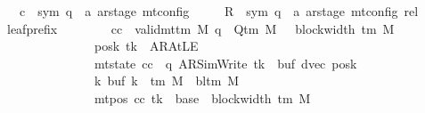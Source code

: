 \begin{isabellebody}
\ \ \ \ \ c{\isacharprime}{\kern0pt}\ {\isacharcolon}{\kern0pt}{\isacharcolon}{\kern0pt}\ {\isachardoublequoteopen}{\isacharparenleft}{\kern0pt}sym{}{\isacharcomma}{\kern0pt}\ {\isacharprime}{\kern0pt}q\ {\isasymtimes}\ {\isacharprime}{\kern0pt}a\ ar{\isacharunderscore}{\kern0pt}stage{\isacharparenright}{\kern0pt}\ mt{\isacharunderscore}{\kern0pt}config{\isachardoublequoteclose}\isanewline
\ \ \ \ \ R{\isacharprime}{\kern0pt}\ {\isacharcolon}{\kern0pt}{\isacharcolon}{\kern0pt}\ {\isachardoublequoteopen}{\isacharparenleft}{\kern0pt}sym{}{\isacharcomma}{\kern0pt}\ {\isacharprime}{\kern0pt}q\ {\isasymtimes}\ {\isacharprime}{\kern0pt}a\ ar{\isacharunderscore}{\kern0pt}stage{\isacharparenright}{\kern0pt}\ mt{\isacharunderscore}{\kern0pt}config\ rel{\isachardoublequoteclose}\isanewline
\ \ \ leaf{\isacharunderscore}{\kern0pt}prefix{\isacharcolon}{\kern0pt}\isanewline
\ \ \ \ \ \ \ \ {\isachardoublequoteopen}{\isasymAnd}cc{\isachardot}{\kern0pt}\ {\isasymlbrakk}\ valid{\isacharunderscore}{\kern0pt}mttm\ M{\isacharsemicolon}{\kern0pt}\ q\ {\isasymin}\ Q{\isacharunderscore}{\kern0pt}tm\ M{\isacharsemicolon}{\kern0pt}\ {}\ {\isasymle}\ block{\isacharunderscore}{\kern0pt}width\ {\isacharparenleft}{\kern0pt}{\isasymGamma}{\isacharunderscore}{\kern0pt}tm\ M{\isacharparenright}{\kern0pt}{\isacharsemicolon}{\kern0pt}\isanewline
\ \ \ \ \ \ \ \ \ \ \ \ \ \ \ \ \ posk\ tk\ {\isasymnoteq}\ AR{\isacharunderscore}{\kern0pt}AtLE{\isacharsemicolon}{\kern0pt}\isanewline
\ \ \ \ \ \ \ \ \ \ \ \ \ \ \ \ \ mt{\isacharunderscore}{\kern0pt}state\ cc\ {\isacharequal}{\kern0pt}\ {\isacharparenleft}{\kern0pt}q{\isacharcomma}{\kern0pt}\ AR{\isacharunderscore}{\kern0pt}SimWrite{\isacharcomma}{\kern0pt}\ tk{\isacharcomma}{\kern0pt}\ {}{\isacharcomma}{\kern0pt}\ buf{\isacharcomma}{\kern0pt}\ dvec{\isacharcomma}{\kern0pt}\ posk{\isacharparenright}{\kern0pt}{\isacharsemicolon}{\kern0pt}\isanewline
\ \ \ \ \ \ \ \ \ \ \ \ \ \ \ \ \ {\isasymforall}k{\isachardot}{\kern0pt}\ buf\ k\ {\isasymin}\ {\isasymGamma}{\isacharunderscore}{\kern0pt}tm\ M\ {\isasymunion}\ {\isacharbraceleft}{\kern0pt}bl{\isacharunderscore}{\kern0pt}tm\ M{\isacharbraceright}{\kern0pt}{\isacharsemicolon}{\kern0pt}\isanewline
\ \ \ \ \ \ \ \ \ \ \ \ \ \ \ \ \ mt{\isacharunderscore}{\kern0pt}pos\ cc\ tk\ {\isacharequal}{\kern0pt}\ base\ {\isacharplus}{\kern0pt}\ block{\isacharunderscore}{\kern0pt}width\ {\isacharparenleft}{\kern0pt}{\isasymGamma}{\isacharunderscore}{\kern0pt}tm\ M{\isacharparenright}{\kern0pt}{\isacharsemicolon}{\kern0pt}\isanewline

\end{isabellebody}
